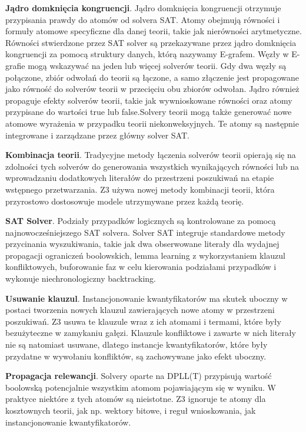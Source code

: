 \textbf{Jądro domknięcia kongruencji}. Jądro domknięcia kongruencji otrzymuje przypisania prawdy do atomów od solvera SAT. Atomy obejmują równości i formuły atomowe specyficzne dla danej teorii, takie jak nierówności arytmetyczne. Równości stwierdzone przez SAT solver są przekazywane przez jądro domknięcia kongruencji za pomocą struktury danych, którą nazywamy E-grafem. Węzły w E-grafie mogą wskazywać na jeden lub więcej solverów teorii. Gdy dwa węzły są połączone, zbiór odwołań do teorii są łączone, a samo złączenie jest propagowane jako równość do solverów teorii w przecięciu obu zbiorów odwołan. Jądro również propaguje efekty solverów teorii, takie jak wywnioskowane równości oraz atomy przypisane do wartości true lub false.Solvery teorii mogą także generować nowe atomowe wyrażenia w przypadku teorii niekonweksyjnych. Te atomy są następnie integrowane i zarządzane przez główny solver SAT.

\textbf{Kombinacja teorii}. Tradycyjne metody łączenia solverów teorii opierają się na zdolności tych solverów do generowania wszystkich wynikających równości lub na wprowadzaniu dodatkowych literałów do przestrzeni poszukiwań na etapie wstępnego przetwarzania. Z3 używa nowej metody kombinacji teorii, która przyrostowo dostosowuje modele utrzymywane przez każdą teorię.

\textbf{SAT Solver}. Podziały przypadków logicznych są kontrolowane za pomocą najnowocześniejszego SAT solvera. Solver SAT integruje standardowe metody przycinania wyszukiwania, takie jak dwa obserwowane literały dla wydajnej propagacji ograniczeń boolowskich, lemma learning z wykorzystaniem klauzul konfliktowych, buforowanie faz w celu kierowania podziałami przypadków i wykonuje niechronologiczny backtracking.

\textbf{Usuwanie klauzul}. Instancjonowanie kwantyfikatorów ma skutek uboczny w postaci tworzenia nowych klauzul zawierających nowe atomy w przestrzeni poszukiwań. Z3 usuwa te klauzule wraz z ich atomami i termami, które były bezużyteczne w zamykaniu gałęzi. Klauzule konfliktowe i zawarte w nich literały nie są natomiast usuwane, dlatego instancje kwantyfikatorów, które były przydatne w wywołaniu konfliktów, są zachowywane jako efekt uboczny.

\textbf{Propagacja relewancji}. Solvery oparte na DPLL(T) przypisują wartość boolowską potencjalnie wszystkim atomom pojawiającym się w wyniku. W praktyce niektóre z tych atomów są nieistotne. Z3 ignoruje te atomy dla kosztownych teorii, jak np. wektory bitowe, i reguł wnioskowania, jak instancjonowanie kwantyfikatorów.

